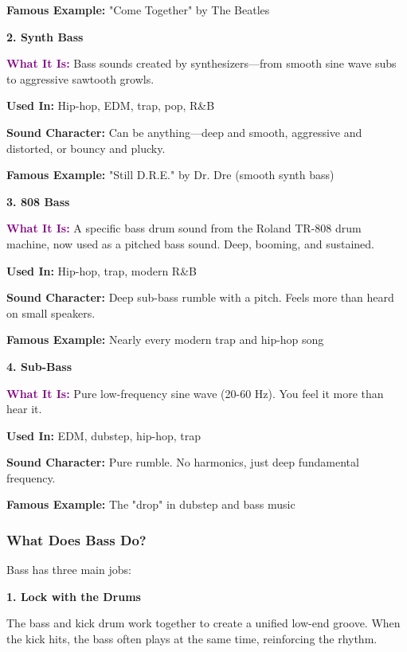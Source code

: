 \documentclass[11pt,letterpaper]{article}
\newcommand{\purple}[1]{\textcolor{purple}{\textbf{#1}}}
\begin{document}
\textbf{Famous Example:} "Come Together" by The Beatles

\vspace{0.5cm}

\textbf{2. Synth Bass}

\textbf{\purple{What It Is:}} Bass sounds created by synthesizers—from smooth sine wave subs to aggressive sawtooth growls.

\textbf{Used In:} Hip-hop, EDM, trap, pop, R\&B

\textbf{Sound Character:} Can be anything—deep and smooth, aggressive and distorted, or bouncy and plucky.

\textbf{Famous Example:} "Still D.R.E." by Dr. Dre (smooth synth bass)

\vspace{0.5cm}

\textbf{3. 808 Bass}

\textbf{\purple{What It Is:}} A specific bass drum sound from the Roland TR-808 drum machine, now used as a pitched bass sound. Deep, booming, and sustained.

\textbf{Used In:} Hip-hop, trap, modern R\&B

\textbf{Sound Character:} Deep sub-bass rumble with a pitch. Feels more than heard on small speakers.

\textbf{Famous Example:} Nearly every modern trap and hip-hop song

\vspace{0.5cm}

\textbf{4. Sub-Bass}

\textbf{\purple{What It Is:}} Pure low-frequency sine wave (20-60 Hz). You feel it more than hear it.

\textbf{Used In:} EDM, dubstep, hip-hop, trap

\textbf{Sound Character:} Pure rumble. No harmonics, just deep fundamental frequency.

\textbf{Famous Example:} The "drop" in dubstep and bass music

\subsubsection{What Does Bass Do?}

Bass has three main jobs:

\textbf{1. Lock with the Drums}

The bass and kick drum work together to create a unified low-end groove. When the kick hits, the bass often plays at the same time, reinforcing the rhythm.
\end{document}
